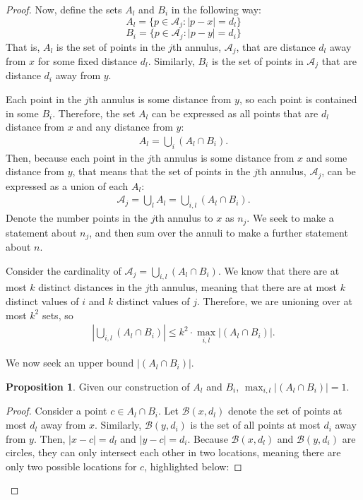 \documentclass{scrippsthesisclass}
\theoremstyle{definition}
\newtheorem{proposition}[theorem]{Proposition}
\begin{document}
\begin{proof}
    Now, define the sets $A_l$ and $B_i$ in the following way:
    \[
    A_l = \{p \in \mathcal{A}_j : |p - x| = d_l\}
    \]
    \[
    B_i = \{p \in \mathcal{A}_j : |p - y| = d_i\}
    \]
    That is, $A_l$ is the set of points in the $j$th annulus, $\mathcal{A}_j$, that are distance $d_l$ away from $x$ for some fixed distance $d_l$.
    Similarly, $B_i$ is the set of points in $\mathcal{A}_j$ that are distance $d_i$ away from $y$. 
    
    Each point in the $j$th annulus is some distance from $y$, so each point is contained in some $B_i$. 
    Therefore, the set $A_l$ can be expressed as all points that are $d_l$ distance from $x$ and any distance from $y$:
    \begin{align}
         A_l = \bigcup_i (A_l \cap B_i).
    \end{align}
    Then, because each point in the $j$th annulus is some distance from $x$ and some distance from $y$, that means that the set of points in the $j$th annulus, $\mathcal{A}_j$, can be expressed as a union of each $A_l$:
    \begin{align}
    \mathcal{A}_j = \bigcup_l A_l = \bigcup_{i, l} (A_l \cap B_i).
    \end{align}
    Denote the number points in the $j$th annulus to $x$ as $n_j$. 
    We seek to make a statement about $n_j$, and then sum over the annuli to make a further statement about $n$. 

    Consider the cardinality of $\mathcal{A}_j = \bigcup \limits_{i, l} (A_l \cap B_i)$.
    We know that there are at most $k$ distinct distances in the $j$th annulus, meaning that there are at most $k$ distinct values of $i$ and $k$ distinct values of $j$. 
    Therefore, we are unioning over at most $k^2$ sets, so 
    \begin{align}
        \left| \bigcup \limits_{i, l} (A_l \cap B_i) \right| \leq k^2 \cdot \max_{i, l} \left|(A_l \cap B_i)\right|.
    \end{align}

    We now seek an upper bound $\left|(A_l \cap B_i)\right|$.
    
    \begin{proposition}
    Given our construction of $A_l$ and $B_i$, $\max_{i, l} \left|(A_l \cap B_i)\right| = 1$. 
    \end{proposition}
    \begin{proof}
    Consider a point $c \in A_l \cap B_i$.
    Let $\mathcal{B}(x, d_l)$ denote the set of points at most $d_l$ away from $x$.
    Similarly, $\mathcal{B}(y, d_i)$ is the set of all points at most $d_i$ away from $y$. 
    Then, $|x - c| = d_l$ and $|y - c| = d_i$.
    Because $\mathcal{B}(x, d_l)$ and $\mathcal{B}(y, d_i)$ are circles, they can only intersect each other in two locations, meaning there are only two possible locations for $c$, highlighted below:


\end{proof}
\end{proof}
\end{document}
